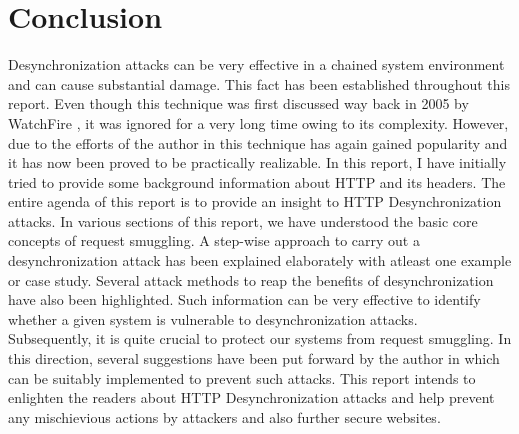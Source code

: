 \chapter{Conclusion}
Desynchronization attacks can be very effective in a chained system environment and can cause substantial damage. This fact has been established throughout this report. Even though this technique was first discussed way back in 2005 by WatchFire \cite{b5}, it was ignored for a very long time owing to its complexity. However, due to the efforts of the author in \cite{b6} this technique has again gained popularity and it has now been proved to be practically realizable. In this report, I have initially tried to provide some background information about HTTP and its headers. The entire agenda of this report is to provide an insight to HTTP Desynchronization attacks. In various sections of this report, we have understood the basic core concepts of request smuggling. A step-wise approach to carry out a desynchronization attack has been explained elaborately with atleast one example or case study. Several attack methods to reap the benefits of desynchronization have also been highlighted. Such information can be very effective to identify whether a given system is vulnerable to desynchronization attacks. \\
Subsequently, it is quite crucial to protect our systems from request smuggling. In this direction, several suggestions have been put forward by the author in \cite{b6} which can be suitably implemented to prevent such attacks. This report intends to enlighten the readers about HTTP Desynchronization attacks and help prevent any mischievious actions by attackers and also further secure websites. 